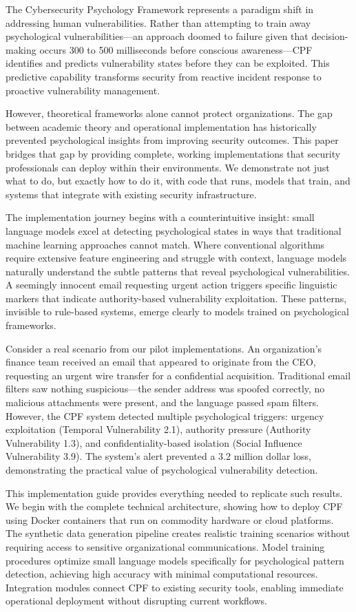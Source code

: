 \documentclass[11pt,a4paper]{article}
\begin{document}
The Cybersecurity Psychology Framework represents a paradigm shift in addressing human vulnerabilities. Rather than attempting to train away psychological vulnerabilities—an approach doomed to failure given that decision-making occurs 300 to 500 milliseconds before conscious awareness—CPF identifies and predicts vulnerability states before they can be exploited. This predictive capability transforms security from reactive incident response to proactive vulnerability management.

However, theoretical frameworks alone cannot protect organizations. The gap between academic theory and operational implementation has historically prevented psychological insights from improving security outcomes. This paper bridges that gap by providing complete, working implementations that security professionals can deploy within their environments. We demonstrate not just what to do, but exactly how to do it, with code that runs, models that train, and systems that integrate with existing security infrastructure.

The implementation journey begins with a counterintuitive insight: small language models excel at detecting psychological states in ways that traditional machine learning approaches cannot match. Where conventional algorithms require extensive feature engineering and struggle with context, language models naturally understand the subtle patterns that reveal psychological vulnerabilities. A seemingly innocent email requesting urgent action triggers specific linguistic markers that indicate authority-based vulnerability exploitation. These patterns, invisible to rule-based systems, emerge clearly to models trained on psychological frameworks.

Consider a real scenario from our pilot implementations. An organization's finance team received an email that appeared to originate from the CEO, requesting an urgent wire transfer for a confidential acquisition. Traditional email filters saw nothing suspicious—the sender address was spoofed correctly, no malicious attachments were present, and the language passed spam filters. However, the CPF system detected multiple psychological triggers: urgency exploitation (Temporal Vulnerability 2.1), authority pressure (Authority Vulnerability 1.3), and confidentiality-based isolation (Social Influence Vulnerability 3.9). The system's alert prevented a 3.2 million dollar loss, demonstrating the practical value of psychological vulnerability detection.

This implementation guide provides everything needed to replicate such results. We begin with the complete technical architecture, showing how to deploy CPF using Docker containers that run on commodity hardware or cloud platforms. The synthetic data generation pipeline creates realistic training scenarios without requiring access to sensitive organizational communications. Model training procedures optimize small language models specifically for psychological pattern detection, achieving high accuracy with minimal computational resources. Integration modules connect CPF to existing security tools, enabling immediate operational deployment without disrupting current workflows.
\end{document}
